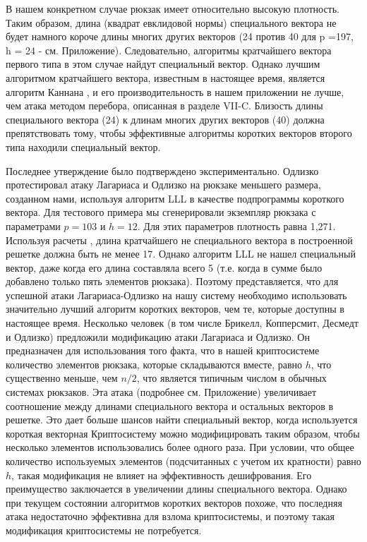 \documentclass[a4paper,12pt]{article}
\newcommand{\DL}{\newline\newline}
\begin{document}
\indent В нашем конкретном случае рюкзак имеет относительно высокую плотность. Таким образом, длина (квадрат евклидовой нормы) специального вектора не будет намного короче длины многих других векторов (24 против 40 для p =197, h = 24 - см. Приложение). Следовательно, алгоритмы кратчайшего вектора первого типа в этом случае найдут специальный вектор. Однако лучшим алгоритмом кратчайшего вектора, известным в настоящее время, является алгоритм Каннана \cite{15}, и его производительность в нашем приложении не лучше, чем атака методом перебора, описанная в разделе VII-C. Близость длины специального вектора (24) к длинам многих других векторов (40) должна препятствовать тому, чтобы эффективные алгоритмы коротких векторов второго типа находили специальный вектор. \newline

\indent
Последнее утверждение было подтверждено экспериментально. Одлизко протестировал атаку Лагариаса и Одлизко на рюкзаке меньшего размера, созданном нами, используя алгоритм LLL в качестве подпрограммы короткого вектора. Для тестового примера мы сгенерировали экземпляр рюкзака с параметрами $p = 103$ и $h = 12$. Для этих параметров плотность равна 1,271. Используя расчеты \cite{17}, длина кратчайшего не специального вектора в построенной решетке должна быть не менее 17. Однако алгоритм LLL не нашел специальный вектор, даже когда его длина составляла всего 5 (т.е. когда в сумме было добавлено только пять элементов рюкзака). Поэтому представляется, что для успешной атаки Лагариаса-Одлизко на нашу систему необходимо использовать значительно лучший алгоритм коротких векторов, чем те, которые доступны в настоящее время. \newline
\indent 
Несколько человек (в том числе Брикелл, Копперсмит, Десмедт и Одлизко) предложили модификацию атаки Лагариаса и Одлизко. Он предназначен для использования того факта, что в нашей криптосистеме количество элементов рюкзака, которые складываются вместе, равно $h$, что существенно меньше, чем $n /2$, что является типичным числом в обычных системах рюкзаков. Эта атака (подробнее см. Приложение) увеличивает соотношение между длинами специального вектора и остальных векторов в решетке. Это дает больше шансов найти специальный вектор, когда используется короткая векторная  \newline
\indent 
Криптосистему можно модифицировать таким образом, чтобы несколько элементов использовались более одного раза. При условии, что общее количество используемых элементов (подсчитанных с учетом их кратности) равно $h$, такая модификация не влияет на эффективность дешифрования. Его преимущество заключается в увеличении длины специального вектора. Однако при текущем состоянии алгоритмов коротких векторов похоже, что последняя атака недостаточно эффективна для взлома криптосистемы, и поэтому такая модификация криптосистемы не потребуется. \DL 
\end{document}
